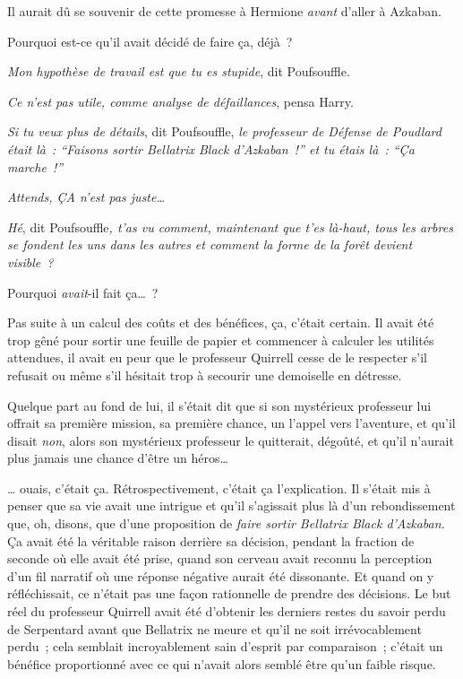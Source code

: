 Il aurait dû se souvenir de cette promesse à Hermione \emph{avant} d'aller à Azkaban.

Pourquoi est-ce qu'il avait décidé de faire ça, déjà~?

\emph{Mon hypothèse de travail est que tu es stupide}, dit Poufsouffle.

\emph{Ce n'est pas utile, comme analyse de défaillances}, pensa Harry.

\emph{Si tu veux plus de détails}, dit Poufsouffle, \emph{le professeur de Défense de Poudlard était là~: “Faisons sortir Bellatrix Black d'Azkaban~!” et tu étais là~: “Ça marche~!”}

\emph{Attends, ÇA n'est pas juste…}

\emph{Hé}, dit Poufsouffle\emph{, t'as vu comment, maintenant que t'es là-haut, tous les arbres se fondent les uns dans les autres et comment la forme de la forêt devient visible~?}

Pourquoi \emph{avait}-il fait ça…~?

Pas suite à un calcul des coûts et des bénéfices, ça, c'était certain.
Il avait été trop gêné pour sortir une feuille de papier et commencer à calculer les utilités attendues, il avait eu peur que le professeur Quirrell cesse de le respecter s'il refusait ou même s'il hésitait trop à secourir une demoiselle en détresse.

Quelque part au fond de lui, il s'était dit que si son mystérieux professeur lui offrait sa première mission, sa première chance, un l'appel vers l'aventure, et qu'il disait \emph{non}, alors son mystérieux professeur le quitterait, dégoûté, et qu'il n'aurait plus jamais une chance d'être un héros…

… ouais, c'était ça.
Rétrospectivement, c'était ça l'explication.
Il s'était mis à penser que sa vie avait une intrigue et qu'il s'agissait plus là d'un rebondissement que, oh, disons, que d'une proposition de \emph{faire sortir Bellatrix Black d'Azkaban.} Ça avait été la véritable raison derrière sa décision, pendant la fraction de seconde où elle avait été prise, quand son cerveau avait reconnu la perception d'un fil narratif où une réponse négative aurait été dissonante.
Et quand on y réfléchissait, ce n'était pas une façon rationnelle de prendre des décisions.
Le but réel du professeur Quirrell avait été d'obtenir les derniers restes du savoir perdu de Serpentard avant que Bellatrix ne meure et qu'il ne soit irrévocablement perdu~; cela semblait incroyablement sain d'esprit par comparaison~; c'était un bénéfice proportionné avec ce qui n'avait alors semblé être qu'un faible risque.

